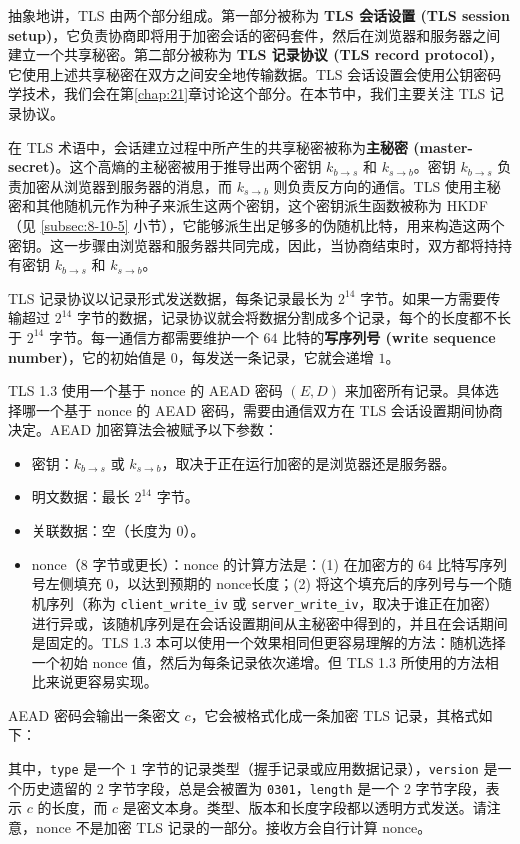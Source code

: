 \begin{snote}
抽象地讲，TLS 由两个部分组成。第一部分被称为 \textbf{TLS 会话设置 (TLS session setup)}，它负责协商即将用于加密会话的密码套件，然后在浏览器和服务器之间建立一个共享秘密。第二部分被称为 \textbf{TLS 记录协议 (TLS record protocol)}，它使用上述共享秘密在双方之间安全地传输数据。TLS 会话设置会使用公钥密码学技术，我们会在第\ref{chap:21}章讨论这个部分。在本节中，我们主要关注 TLS 记录协议。

在 TLS 术语中，会话建立过程中所产生的共享秘密被称为\textbf{主秘密 (master-secret)}。这个高熵的主秘密被用于推导出两个密钥 $k_{b\to s}$ 和 $k_{s\to b}$。密钥 $k_{b\to s}$ 负责加密从浏览器到服务器的消息，而 $k_{s\to b}$ 则负责反方向的通信。TLS 使用主秘密和其他随机元作为种子来派生这两个密钥，这个密钥派生函数被称为 HKDF（见 \ref{subsec:8-10-5} 小节），它能够派生出足够多的伪随机比特，用来构造这两个密钥。这一步骤由浏览器和服务器共同完成，因此，当协商结束时，双方都将持持有密钥 $k_{b\to s}$ 和 $k_{s\to b}$。

TLS 记录协议以记录形式发送数据，每条记录最长为 $2^{14}$ 字节。如果一方需要传输超过 $2^{14}$ 字节的数据，记录协议就会将数据分割成多个记录，每个的长度都不长于 $2^{14}$ 字节。每一通信方都需要维护一个 $64$ 比特的\textbf{写序列号 (write sequence number)}，它的初始值是 $0$，每发送一条记录，它就会递增 $1$。

TLS 1.3 使用一个基于 nonce 的 AEAD 密码 $(E,D)$ 来加密所有记录。具体选择哪一个基于 nonce 的 AEAD 密码，需要由通信双方在 TLS 会话设置期间协商决定。AEAD 加密算法会被赋予以下参数：
\begin{itemize}
	\item 密钥：$k_{b\to s}$ 或 $k_{s\to b}$，取决于正在运行加密的是浏览器还是服务器。
	\item 明文数据：最长 $2^{14}$ 字节。
	\item 关联数据：空（长度为 $0$）。
	\item nonce（$8$ 字节或更长）：nonce 的计算方法是：(1) 在加密方的 $64$ 比特写序列号左侧填充 $0$，以达到预期的 nonce长度；(2) 将这个填充后的序列号与一个随机序列（称为 \texttt{client\_write\_iv} 或 \texttt{server\_write\_iv}，取决于谁正在加密）进行异或，该随机序列是在会话设置期间从主秘密中得到的，并且在会话期间是固定的。TLS 1.3 本可以使用一个效果相同但更容易理解的方法：随机选择一个初始 nonce 值，然后为每条记录依次递增。但 TLS 1.3 所使用的方法相比来说更容易实现。
\end{itemize}

AEAD 密码会输出一条密文 $c$，它会被格式化成一条加密 TLS 记录，其格式如下：
\begin{center}

\end{center}
其中，\texttt{type} 是一个 $1$ 字节的记录类型（握手记录或应用数据记录），\texttt{version} 是一个历史遗留的 $2$ 字节字段，总是会被置为 \texttt{0301}，\texttt{length} 是一个 $2$ 字节字段，表示 $c$ 的长度，而 $c$ 是密文本身。类型、版本和长度字段都以透明方式发送。请注意，nonce 不是加密 TLS 记录的一部分。接收方会自行计算 nonce。


\end{snote}
